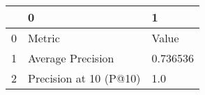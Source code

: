 \begin{tabular}{lll}
\toprule
{} &                       0 &         1 \\
\midrule
0 &                  Metric &     Value \\
1 &       Average Precision &  0.736536 \\
2 &  Precision at 10 (P@10) &       1.0 \\
\bottomrule
\end{tabular}
